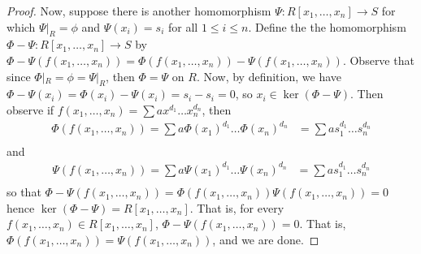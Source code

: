 \begin{proof}
  Now, suppose there is another homomorphism $\Psi:R[x_1, \dots, x_n]
  \xrightarrow{} S$ for which $\Psi|_R=\phi$ and $\Psi(x_i)=s_i$ for
  all $1 \leq i \leq n$. Define the the homomorphism $\Phi-\Psi:R[x_1,
  \dots, x_n] \xrightarrow{} S$ by $\Phi-\Psi(f(x_1, \dots,
  x_n))=\Phi(f(x_1, \dots, x_n))-\Psi(f(x_1, \dots, x_n))$. Observe
  that since $\Phi|_R=\phi=\Psi|_R$, then $\Phi=\Psi$ on $R$. Now, by
  definition, we have $\Phi-\Psi(x_i)=\Phi(x_i)-\Psi(x_i)=s_i-s_i=0$,
  so $x_i \in \ker{(\Phi-\Psi)}$. Then observe if $f(x_1, \dots,
  x_n)=\sum{ax^{d_1} \dots x_n^{d_n}}$, then
  \begin{align*}
    \Phi(f(x_1, \dots, x_n))=\sum{a\Phi(x_1)^{d_1} \dots \Phi(x_n)^{d_n}}
    &= \sum{as_1^{d_1} \dots s_n^{d_n}} \\
  \end{align*}
  and
  \begin{align*}
    \Psi(f(x_1, \dots, x_n))=\sum{a\Psi(x_1)^{d_1} \dots \Psi(x_n)^{d_n}}
    &= \sum{as_1^{d_1} \dots s_n^{d_n}} \\
  \end{align*}
  so that $\Phi-\Psi(f(x_1, \dots, x_n))=\Phi(f(x_1, \dots,
  x_n))\Psi(f(x_1, \dots, x_n))=0$ hence $\ker{(\Phi-\Psi)}=R[x_1,
  \dots, x_n]$. That is, for every $f(x_1, \dots, x_n) \in R[x_1,
  \dots, x_n]$, $\Phi-\Psi(f(x_1, \dots, x_n))=0$. That is,
  $\Phi(f(x_1, \dots, x_n))=\Psi(f(x_1, \dots, x_n))$, and we are
  done.
\end{proof}


